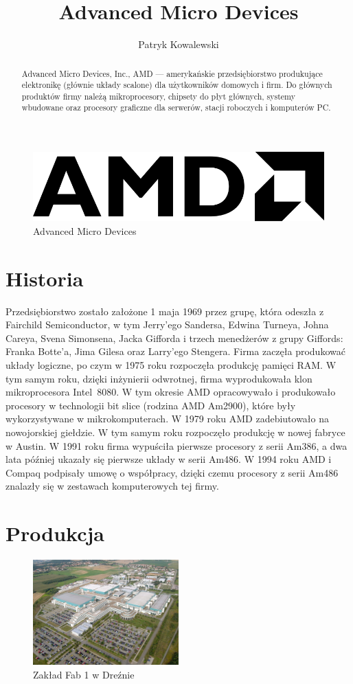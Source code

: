 \documentclass[a4paper,12pt]{article}
\title{Advanced Micro Devices}
\author{Patryk Kowalewski}
\begin{document}
\maketitle

\begin{abstract}\noindent Advanced Micro Devices, Inc., AMD --- amerykańskie przedsiębiorstwo produkujące elektronikę (głównie układy scalone) dla użytkowników domowych i firm. Do głównych produktów firmy należą mikroprocesory, chipsety do płyt głównych, systemy wbudowane oraz procesory graficzne dla serwerów, stacji roboczych i komputerów PC.
\end{abstract}

\begin{figure}[h]
\centering
\includegraphics[width=0.3\hsize]{amd.png}
\caption{Advanced Micro Devices}\label{AMD}
\end{figure}

\section{Historia}

Przedsiębiorstwo zostało założone 1 maja 1969 przez grupę, która odeszła z Fairchild Semiconductor, w tym Jerry’ego Sandersa, Edwina Turneya, Johna Careya, Svena Simonsena, Jacka Gifforda i trzech menedżerów z grupy Giffords: Franka Botte’a, Jima Gilesa oraz Larry’ego Stengera. Firma zaczęła produkować układy logiczne, po czym w 1975 roku rozpoczęła produkcję pamięci RAM. W tym samym roku, dzięki inżynierii odwrotnej, firma wyprodukowała klon mikroprocesora Intel~8080. W tym okresie AMD opracowywało i produkowało procesory w technologii bit slice (rodzina AMD Am2900), które były wykorzystywane w mikrokomputerach. W 1979 roku AMD zadebiutowało na nowojorskiej giełdzie. W tym samym roku rozpoczęło produkcję w nowej fabryce w Austin.
W 1991 roku firma wypuściła pierwsze procesory z serii Am386, a dwa lata później ukazały się pierwsze układy w serii Am486. W 1994 roku AMD i Compaq podpisały umowę o współpracy, dzięki czemu procesory z serii Am486 znalazły się w zestawach komputerowych tej firmy.

\section{Produkcja}

\begin{figure}[h]
\centering
\includegraphics[width=0.5\textwidth]{fab1.jpg}
\caption{Zakład Fab 1 w Dreźnie}\label{Fab 1}
\end{figure}
\end{document}
